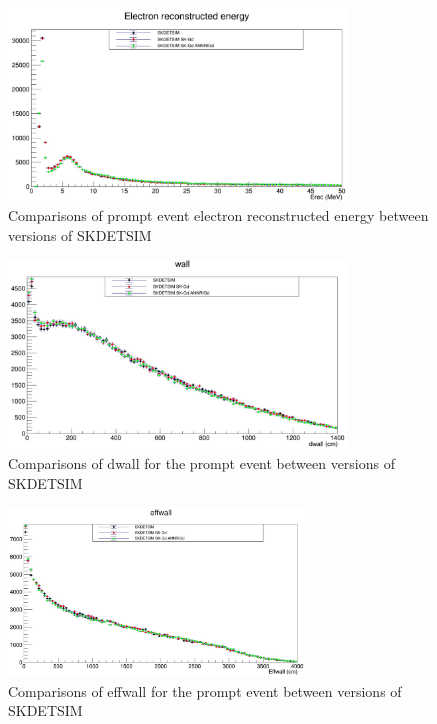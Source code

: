 \begin{figure}
    \centering
    \includegraphics[width=0.8\textwidth]{Figures/erec_compare.png}
    \caption{Comparisons of prompt event electron reconstructed energy between versions of SKDETSIM}
    \label{fig:erec_compare}

\end{figure}

\begin{figure}
    \centering
    \includegraphics[width=0.8\textwidth]{Figures/dwall_compare.png}
    \caption{Comparisons of dwall for the prompt event between versions of SKDETSIM}
    \label{fig:dwall_compare}

\end{figure}

\begin{figure}
    \centering
    \includegraphics[width=0.7\textwidth]{Figures/effwall_compare.png}
    \caption{Comparisons of effwall for the prompt event between versions of SKDETSIM}
    \label{fig:effwall_compare}

\end{figure}


